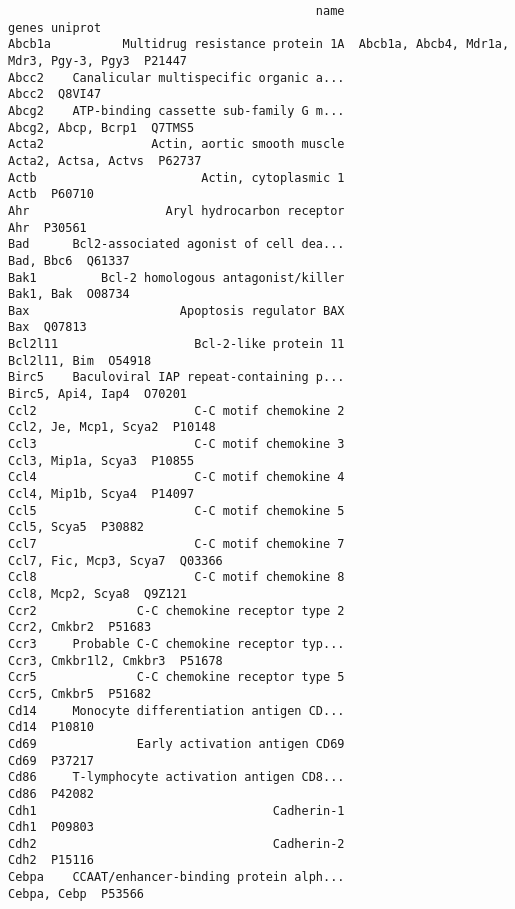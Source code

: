 \documentclass[]{article}
\begin{document}
\begin{verbatim}
                                           name                                    genes uniprot
Abcb1a          Multidrug resistance protein 1A  Abcb1a, Abcb4, Mdr1a, Mdr3, Pgy-3, Pgy3  P21447
Abcc2    Canalicular multispecific organic a...                                    Abcc2  Q8VI47
Abcg2    ATP-binding cassette sub-family G m...                       Abcg2, Abcp, Bcrp1  Q7TMS5
Acta2               Actin, aortic smooth muscle                      Acta2, Actsa, Actvs  P62737
Actb                       Actin, cytoplasmic 1                                     Actb  P60710
Ahr                   Aryl hydrocarbon receptor                                      Ahr  P30561
Bad      Bcl2-associated agonist of cell dea...                                Bad, Bbc6  Q61337
Bak1         Bcl-2 homologous antagonist/killer                                Bak1, Bak  O08734
Bax                     Apoptosis regulator BAX                                      Bax  Q07813
Bcl2l11                   Bcl-2-like protein 11                             Bcl2l11, Bim  O54918
Birc5    Baculoviral IAP repeat-containing p...                        Birc5, Api4, Iap4  O70201
Ccl2                      C-C motif chemokine 2                    Ccl2, Je, Mcp1, Scya2  P10148
Ccl3                      C-C motif chemokine 3                       Ccl3, Mip1a, Scya3  P10855
Ccl4                      C-C motif chemokine 4                       Ccl4, Mip1b, Scya4  P14097
Ccl5                      C-C motif chemokine 5                              Ccl5, Scya5  P30882
Ccl7                      C-C motif chemokine 7                   Ccl7, Fic, Mcp3, Scya7  Q03366
Ccl8                      C-C motif chemokine 8                        Ccl8, Mcp2, Scya8  Q9Z121
Ccr2              C-C chemokine receptor type 2                             Ccr2, Cmkbr2  P51683
Ccr3     Probable C-C chemokine receptor typ...                   Ccr3, Cmkbr1l2, Cmkbr3  P51678
Ccr5              C-C chemokine receptor type 5                             Ccr5, Cmkbr5  P51682
Cd14     Monocyte differentiation antigen CD...                                     Cd14  P10810
Cd69              Early activation antigen CD69                                     Cd69  P37217
Cd86     T-lymphocyte activation antigen CD8...                                     Cd86  P42082
Cdh1                                 Cadherin-1                                     Cdh1  P09803
Cdh2                                 Cadherin-2                                     Cdh2  P15116
Cebpa    CCAAT/enhancer-binding protein alph...                              Cebpa, Cebp  P53566

\end{verbatim}
\end{document}
